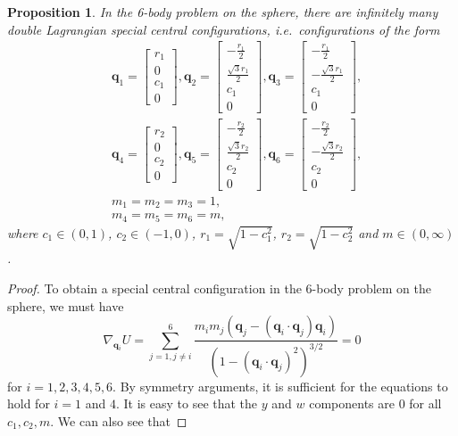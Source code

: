 \documentclass[12pt]{amsart}
\newtheorem{proposition}{Proposition}
\theoremstyle{definition}
\newcommand {\q} {\mathbf{q}}
\begin{document}
{\begin{proposition}In the 6-body problem on the sphere, there are infinitely many double Lagrangian special central configurations, i.e.\ configurations of the form 
\begin{align*}
&\q_1=\begin{bmatrix}r_1\\0\\c_1\\0\end{bmatrix}, \q_2=\begin{bmatrix}-\frac{r_1}{2}\\ \frac{\sqrt{3}r_1}{2}\\ c_1\\0\end{bmatrix}, \q_3=\begin{bmatrix}-\frac{r_1}{2}\\-\frac{\sqrt{3}r_1}{2} \\ c_1\\0\end{bmatrix},\\ &\q_4=\begin{bmatrix}r_2\\0\\c_2\\0\end{bmatrix}, \q_5=\begin{bmatrix}-\frac{r_2}{2}\\ \frac{\sqrt{3}r_2}{2}\\ c_2\\0\end{bmatrix}, \q_6=\begin{bmatrix}-\frac{r_2}{2}\\ -\frac{\sqrt{3}r_2}{2}\\c_2\\0\end{bmatrix},\\
&m_1=m_2=m_3=1,\\
&m_4=m_5=m_6=m,
\end{align*}
where $c_1 \in (0,1)$, $c_2 \in (-1,0)$, $r_1=\sqrt{1-c_1^2}$, $r_2=\sqrt{1-c_2^2}$ and $m \in (0,\infty)$.
\end{proposition}
\begin{proof}
To obtain a special central configuration in the 6-body problem on the sphere, we must have \begin{equation*}
\nabla_{\q_i} U=\sum\limits_{j=1, j\neq i}^6 \frac{m_im_j(\q_j-(\q_i \cdot \q_j)\q_i)}{(1-(\q_i \cdot \q_j)^2)^{3/2}}=0\end{equation*} for $i=1,2,3,4,5,6$. By symmetry arguments, it is sufficient for the equations to hold for $i=1$ and $4$. It is easy to see that the $y$ and $w$ components are 0 for all $c_1, c_2, m$. We can also see that 

\end{proof}}
\end{document}
